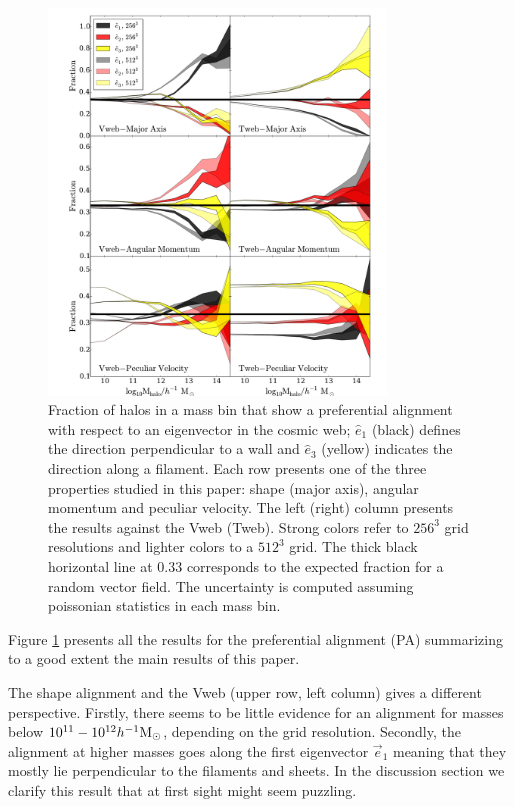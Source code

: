 \documentclass[useAMS,usenatbib]{mn2e}
\newcommand{\hMsun}{{\ifmmode{h^{-1}{\rm
        {M_{\odot}}}}\else{$h^{-1}{\rm{M_{\odot}}}$~}\fi}}
\begin{document}
\begin{figure}
\includegraphics[width=0.8\textwidth]{Fig1.pdf}
\caption{Fraction of halos in a mass bin that show a preferential
  alignment with respect to an eigenvector in the cosmic
  web; $\hat{e}_1$ (black) defines the direction perpendicular to a wall and
  $\hat{e}_3$ (yellow) indicates the direction along a filament. Each row
  presents one of the three properties studied in this paper: shape (major axis),
  angular momentum and  peculiar velocity. The left (right) column presents the
  results against the Vweb (Tweb). Strong colors refer to $256^3$ grid
  resolutions and lighter colors to a $512^3$ grid. The thick black
  horizontal line at $0.33$ corresponds to the expected fraction for a
  random vector field. The uncertainty is computed assuming poissonian
  statistics in each mass bin.
\label{fig:preferential}}
\end{figure}

Figure \ref{fig:preferential} presents all the results for the
preferential alignment (PA) summarizing to a good extent the main
results of this paper.

The shape alignment and the Vweb (upper row, left column) gives a
different perspective. Firstly, there seems to be little evidence
for an alignment for masses below $10^{11}-10^{12}\hMsun$, depending
on the grid resolution. Secondly, the alignment at higher masses goes
along the first eigenvector $\vec{e}_{1}$ meaning that they mostly lie
perpendicular to the filaments and sheets. In the discussion section
we clarify this result that at first sight might seem puzzling.
\end{document}
